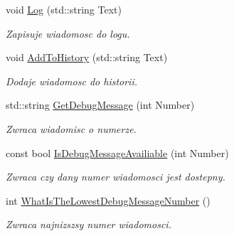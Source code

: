 \begin{DoxyCompactItemize}
\mbox{\label{classtfp_1_1_debug_class_a01b47eb735ae9a2309df1095321e4776}} 
void \mbox{\hyperlink{classtfp_1_1_debug_class_a01b47eb735ae9a2309df1095321e4776}{Log}} (std\+::string Text)
\begin{DoxyCompactList}\small\item\em Zapisuje wiadomosc do logu. \end{DoxyCompactList}\item 
\mbox{\label{classtfp_1_1_debug_class_ab0f6da60a7cb6b8840f6249206d03d8c}} 
void \mbox{\hyperlink{classtfp_1_1_debug_class_ab0f6da60a7cb6b8840f6249206d03d8c}{Add\+To\+History}} (std\+::string Text)
\begin{DoxyCompactList}\small\item\em Dodaje wiadomosc do historii. \end{DoxyCompactList}\item 
\mbox{\label{classtfp_1_1_debug_class_aad5bf085bdaf254997dfe45cb4557f2b}} 
std\+::string \mbox{\hyperlink{classtfp_1_1_debug_class_aad5bf085bdaf254997dfe45cb4557f2b}{Get\+Debug\+Message}} (int Number)
\begin{DoxyCompactList}\small\item\em Zwraca wiadomisc o numerze. \end{DoxyCompactList}\item 
\mbox{\label{classtfp_1_1_debug_class_a5d7c1e5c227fbf1a189c797c772a73cc}} 
const bool \mbox{\hyperlink{classtfp_1_1_debug_class_a5d7c1e5c227fbf1a189c797c772a73cc}{Is\+Debug\+Message\+Availiable}} (int Number)
\begin{DoxyCompactList}\small\item\em Zwraca czy dany numer wiadomosci jest dostepny. \end{DoxyCompactList}\item 
\mbox{\label{classtfp_1_1_debug_class_a06f935f8abee02e5633fc26e6b0b380e}} 
int \mbox{\hyperlink{classtfp_1_1_debug_class_a06f935f8abee02e5633fc26e6b0b380e}{What\+Is\+The\+Lowest\+Debug\+Message\+Number}} ()
\begin{DoxyCompactList}\small\item\em Zwraca najnizszsy numer wiadomosci. \end{DoxyCompactList}\item 

\end{DoxyCompactItemize}
